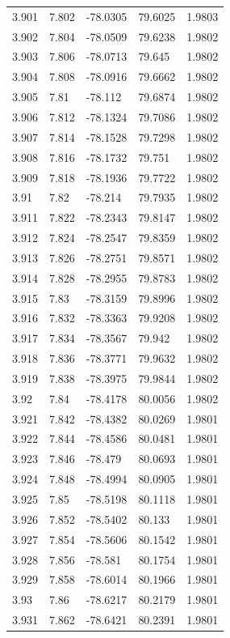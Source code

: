 \begin{tabular}{lllll}
3.901 & 7.802 & -78.0305 & 79.6025 & 1.9803 \\
3.902 & 7.804 & -78.0509 & 79.6238 & 1.9802 \\
3.903 & 7.806 & -78.0713 & 79.645 & 1.9802 \\
3.904 & 7.808 & -78.0916 & 79.6662 & 1.9802 \\
3.905 & 7.81 & -78.112 & 79.6874 & 1.9802 \\
3.906 & 7.812 & -78.1324 & 79.7086 & 1.9802 \\
3.907 & 7.814 & -78.1528 & 79.7298 & 1.9802 \\
3.908 & 7.816 & -78.1732 & 79.751 & 1.9802 \\
3.909 & 7.818 & -78.1936 & 79.7722 & 1.9802 \\
3.91 & 7.82 & -78.214 & 79.7935 & 1.9802 \\
3.911 & 7.822 & -78.2343 & 79.8147 & 1.9802 \\
3.912 & 7.824 & -78.2547 & 79.8359 & 1.9802 \\
3.913 & 7.826 & -78.2751 & 79.8571 & 1.9802 \\
3.914 & 7.828 & -78.2955 & 79.8783 & 1.9802 \\
3.915 & 7.83 & -78.3159 & 79.8996 & 1.9802 \\
3.916 & 7.832 & -78.3363 & 79.9208 & 1.9802 \\
3.917 & 7.834 & -78.3567 & 79.942 & 1.9802 \\
3.918 & 7.836 & -78.3771 & 79.9632 & 1.9802 \\
3.919 & 7.838 & -78.3975 & 79.9844 & 1.9802 \\
3.92 & 7.84 & -78.4178 & 80.0056 & 1.9802 \\
3.921 & 7.842 & -78.4382 & 80.0269 & 1.9801 \\
3.922 & 7.844 & -78.4586 & 80.0481 & 1.9801 \\
3.923 & 7.846 & -78.479 & 80.0693 & 1.9801 \\
3.924 & 7.848 & -78.4994 & 80.0905 & 1.9801 \\
3.925 & 7.85 & -78.5198 & 80.1118 & 1.9801 \\
3.926 & 7.852 & -78.5402 & 80.133 & 1.9801 \\
3.927 & 7.854 & -78.5606 & 80.1542 & 1.9801 \\
3.928 & 7.856 & -78.581 & 80.1754 & 1.9801 \\
3.929 & 7.858 & -78.6014 & 80.1966 & 1.9801 \\
3.93 & 7.86 & -78.6217 & 80.2179 & 1.9801 \\
3.931 & 7.862 & -78.6421 & 80.2391 & 1.9801 \\

\end{tabular}
